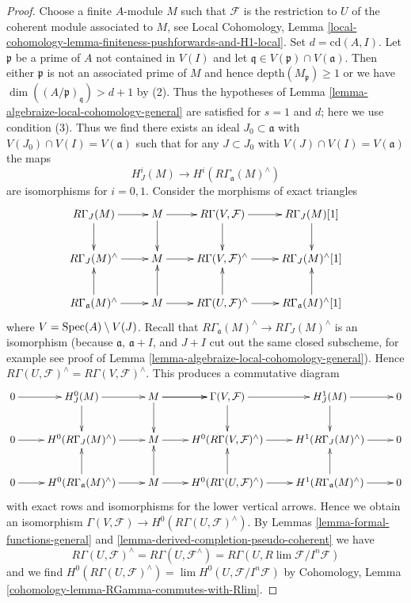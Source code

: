 \begin{proof}
Choose a finite $A$-module $M$ such that $\mathcal{F}$ is the restriction
to $U$ of the coherent module associated to $M$, see Local Cohomology,
Lemma \ref{local-cohomology-lemma-finiteness-pushforwards-and-H1-local}.
Set $d = \text{cd}(A, I)$.
Let $\mathfrak p$ be a prime of $A$ not contained in $V(I)$
and let $\mathfrak q \in V(\mathfrak p) \cap V(\mathfrak a)$.
Then either $\mathfrak p$ is not an associated prime of $M$
and hence $\text{depth}(M_\mathfrak p) \geq 1$
or we have $\dim((A/\mathfrak p)_\mathfrak q) > d + 1$ by (2).
Thus the hypotheses of
Lemma \ref{lemma-algebraize-local-cohomology-general}
are satisfied for $s = 1$ and $d$; here we use condition (3).
Thus we find there exists an ideal
$J_0 \subset \mathfrak a$ with $V(J_0) \cap V(I) = V(\mathfrak a)$
such that for any $J \subset J_0$ with $V(J) \cap V(I) = V(\mathfrak a)$
the maps
$$
H^i_J(M) \longrightarrow H^i(R\Gamma_\mathfrak a(M)^\wedge)
$$
are isomorphisms for $i = 0, 1$. Consider the morphisms of
exact triangles
$$
\xymatrix{
R\Gamma_J(M)  \ar[d] \ar[r] &
M \ar[r] \ar[d] &
R\Gamma(V, \mathcal{F}) \ar[d] \ar[r] &
R\Gamma_J(M)[1]  \ar[d] \\
R\Gamma_J(M)^\wedge \ar[r] &
M \ar[r] &
R\Gamma(V, \mathcal{F})^\wedge \ar[r] &
R\Gamma_J(M)^\wedge[1] \\
R\Gamma_\mathfrak a(M)^\wedge \ar[r] \ar[u] &
M \ar[r] \ar[u] &
R\Gamma(U, \mathcal{F})^\wedge \ar[r] \ar[u] &
R\Gamma_\mathfrak a(M)^\wedge[1] \ar[u]
}
$$
where $V = \mathop{\mathrm{Spec}}(A) \setminus V(J)$. Recall that
$R\Gamma_\mathfrak a(M)^\wedge \to R\Gamma_J(M)^\wedge$
is an isomorphism (because $\mathfrak a$, $\mathfrak a + I$, and $J + I$
cut out the same closed subscheme, for example
see proof of Lemma \ref{lemma-algebraize-local-cohomology-general}).
Hence
$R\Gamma(U, \mathcal{F})^\wedge = R\Gamma(V, \mathcal{F})^\wedge$.
This produces a commutative diagram
$$
\xymatrix{
0 \ar[r] &
H^0_J(M) \ar[r] \ar[d] &
M \ar[r] \ar[d] \ar[r] &
\Gamma(V, \mathcal{F}) \ar[d] \ar[r] &
H^1_J(M) \ar[d] \ar[r] &
0 \\
0 \ar[r] &
H^0(R\Gamma_J(M)^\wedge) \ar[r] &
M \ar[r] &
H^0(R\Gamma(V, \mathcal{F})^\wedge) \ar[r] &
H^1(R\Gamma_J(M)^\wedge) \ar[r] &
0 \\
0 \ar[r] &
H^0(R\Gamma_\mathfrak a(M)^\wedge) \ar[r] \ar[u] &
M \ar[r] \ar[u] &
H^0(R\Gamma(U, \mathcal{F})^\wedge) \ar[r] \ar[u] &
H^1(R\Gamma_\mathfrak a(M)^\wedge) \ar[r] \ar[u] &
0
}
$$
with exact rows and isomorphisms for the lower vertical arrows. Hence
we obtain an isomorphism
$\Gamma(V, \mathcal{F}) \to H^0(R\Gamma(U, \mathcal{F})^\wedge)$.
By Lemmas \ref{lemma-formal-functions-general}
and \ref{lemma-derived-completion-pseudo-coherent} we have
$$
R\Gamma(U, \mathcal{F})^\wedge =
R\Gamma(U, \mathcal{F}^\wedge) =
R\Gamma(U, R\lim \mathcal{F}/I^n\mathcal{F})
$$
and we find $H^0(R\Gamma(U, \mathcal{F})^\wedge) =
\lim H^0(U, \mathcal{F}/I^n\mathcal{F})$ by
Cohomology, Lemma \ref{cohomology-lemma-RGamma-commutes-with-Rlim}.
\end{proof}

